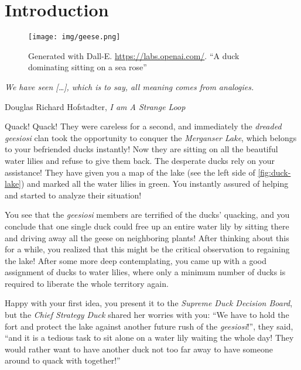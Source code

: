 \chapter{Introduction}\label{ch:introduction}

\vspace*{-50pt}

\begin{figure}[ht]
        \texttt{[image: img/geese.png]}
        \captionsetup{textformat=empty,labelformat=blank}
        \caption[Generated with Dalle-E. Knowledge Cutoff 09-2022]{Generated with Dall-E. \url{https://labs.openai.com/}. ``A duck dominating sitting on a sea rose''}
\end{figure}

\epigraph{\itshape We have seen [\ldots], which is to say, all meaning comes from analogies.}{Douglas Richard Hofstadter, \textit{I am A Strange Loop}}

Quack! Quack! They were careless for a second, and immediately the \textit{dreaded geesiosi} clan took the opportunity to conquer the  \textit{Merganser Lake}, which belongs to your befriended ducks instantly! %
Now they are sitting on all the beautiful water lilies and refuse to give them back. The desperate ducks rely on your assistance!
They have given you a map of the lake (see the left side of \cref{fig:duck-lake}) and marked all the water lilies in green.
You instantly assured of helping and started to analyze their situation!

You see that the \textit{geesiosi} members are terrified of the ducks' quacking, and you conclude that one single duck could free up an entire water lily by sitting there and driving away all the geese on neighboring plants! 
After thinking about this for a while, you realized that this might be the critical observation to regaining the lake!
After some more deep contemplating, you came up with a good assignment of ducks to water lilies, where only a minimum number of ducks is required to liberate the whole territory again.

Happy with your first idea, you present it to the \textit{Supreme Duck Decision Board}, but the \textit{Chief Strategy Duck} shared her worries with you: 
``We have to hold the fort and protect the lake against another future rush of the \textit{geesiosi}!'', they said, ``and it is a tedious task to sit alone on a water lily waiting the whole day! They would rather want to have another duck not too far away to have someone around to quack with together!''

